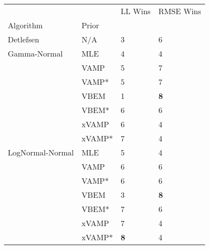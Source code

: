 \begin{tabular}{llll}
\toprule
                 &        &     LL Wins &   RMSE Wins \\
Algorithm & Prior &             &             \\
\midrule
Detlefsen & N/A &           3 &           6 \\
Gamma-Normal & MLE &           4 &           4 \\
                 & VAMP &           5 &           7 \\
                 & VAMP* &           5 &           7 \\
                 & VBEM &           1 &  \textbf{8} \\
                 & VBEM* &           6 &           6 \\
                 & xVAMP &           6 &           4 \\
                 & xVAMP* &           7 &           4 \\
LogNormal-Normal & MLE &           5 &           4 \\
                 & VAMP &           6 &           6 \\
                 & VAMP* &           6 &           6 \\
                 & VBEM &           3 &  \textbf{8} \\
                 & VBEM* &           7 &           6 \\
                 & xVAMP &           7 &           4 \\
                 & xVAMP* &  \textbf{8} &           4 \\
\bottomrule
\end{tabular}

